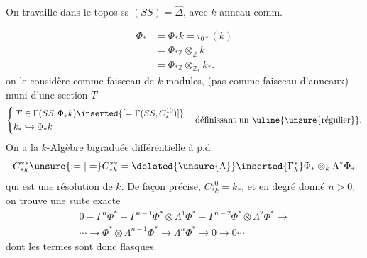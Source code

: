 
On travaille dans le topos ss $(SS)=\widehat{\Delta}$, avec $k$ anneau comm.

\[
\begin{aligned}
\Phi_*&=\Phi_*k=i_{0*}(k)\\
&=\Phi_{*\mathbb Z}\otimes_{\mathbb Z}k\\
&=\Phi_{*\mathbb Z}\otimes_{\mathbb Z_*}k_* .
\end{aligned}
\]
 on le considère comme faisceau de $k$-modules, (pas comme faisceau d'anneaux) muni d'une section $T$
\[
\left\{\begin{aligned}
T&\in\Gamma(SS,\Phi_*k)\inserted{[=\Gamma(SS,C_*^{10})]}\\
k_*&\hookrightarrow\Phi_*k
\end{aligned}\right.
\quad\text{définissant un \uline{\unsure{régulier}}}.
\]
On a la $k$-Algèbre bigraduée  différentielle à p.d.
\[
C_{*k}^{**}\unsure{:=|=}C_{*k}^{**}
=\deleted{\unsure{\Lambda}}\inserted{\Gamma_k^*}\Phi_*\otimes_k\Lambda^*\Phi_*
\]
qui est une résolution de $k$. De façon précise,
$C_{*k}^{00}=k_*$, et en degré  donné $n>0$,
on trouve une suite exacte
\[
\begin{gathered}
0-\Gamma^n\Phi^*-\Gamma^{n-1}\Phi^*\otimes\Lambda^1\Phi^*
-\Gamma^{n-2}\Phi^*\otimes\Lambda^2\Phi^*\longrightarrow\\
\cdots\longrightarrow\Phi^*\otimes\Lambda^{n-1}\Phi^*
\longrightarrow\Lambda^n\Phi^*\longrightarrow0\longrightarrow0\cdots
\end{gathered}
\]
dont les termes sont donc flasques.

